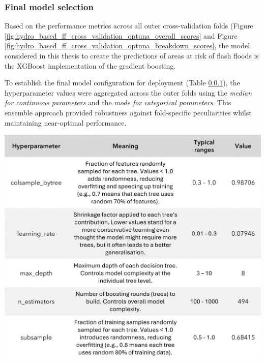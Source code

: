 \subsubsection{Final model selection}

Based on the performance metrics across all outer cross-validation folds (Figure \ref{fig:hydro_based_ff_cross_validation_optuna_overall_scores} and Figure \ref{fig:hydro_based_ff_cross_validation_optuna_breakdown_scores}, the model considered in this thesis to create the predictions of areas at risk of flash floods is the XGBoost implementation of the gradient boosting.

To establish the final model configuration for deployment (Table \ref{}), the hyperparameter values were aggregated across the outer folds using the \textit{median for continuous parameters} and the \textit{mode for categorical parameters}. This ensemble approach provided robustness against fold-specific peculiarities whilst maintaining near-optimal performance. 

\begin{table}[htbp]
\centering
{}
\includegraphics[width=\textwidth]{xgboost_final_configuration.png}
\label{table:xgboost_final_configuration}
\end{table}

